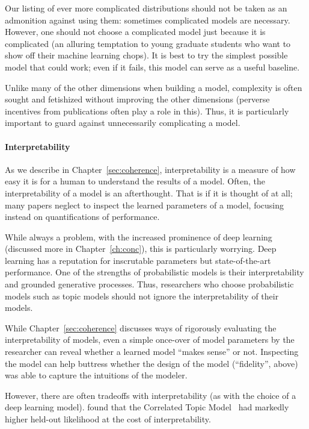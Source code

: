 Our listing of ever more complicated distributions should not be taken
as an admonition against using them: sometimes complicated models are
necessary.  However, one should not choose a complicated model just
because it is complicated (an alluring temptation to young graduate
students who want to show off their machine learning chops). It is
best to try the simplest possible model that could work; even if it
fails, this model can serve as a useful baseline.

Unlike many of the other dimensions when building a model, complexity
is often sought and fetishized without improving the other dimensions
(perverse incentives from publications often play a role in this).
Thus, it is particularly important to guard against unnecessarily
complicating a model.

\paragraph{Interpretability}

As we describe in Chapter~\ref{sec:coherence}, interpretability is a measure of how
easy it is for a human to understand the results of a model.  Often,
the interpretability of a model is an afterthought.  That is if it is thought of
at all; many papers neglect to inspect the learned parameters of a
model, focusing instead on quantifications of performance.

While always a problem, with the increased prominence of deep learning (discussed more in
Chapter~\ref{ch:conc}), this is particularly worrying.  Deep learning has a
reputation for inscrutable parameters but state-of-the-art
performance.  One of the strengths of probabilistic models is their
interpretability and grounded generative processes.  Thus, researchers who
choose probabilistic models such as topic models should not ignore the
interpretability of their models.

While Chapter~\ref{sec:coherence} discusses ways of rigorously evaluating the
interpretability of models, even a simple once-over of model
parameters by the researcher can reveal whether a learned model
``makes sense'' or not.  Inspecting the model can help buttress
whether the design of the model (``fidelity'', above) was able to
capture the intuitions of the modeler.

However, there are often tradeoffs with interpretability (as with the
choice of a deep learning model).  \citet{chang-09a} found that the Correlated
Topic Model~\citep{blei2007correlated} had markedly higher held-out likelihood at the
cost of interpretability.

